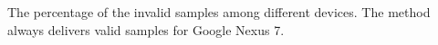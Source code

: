 The percentage of the invalid samples among different devices. The method always delivers valid samples for Google Nexus 7.
